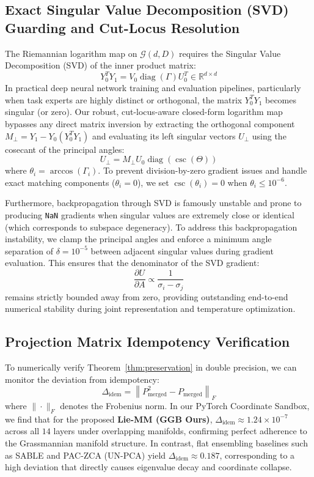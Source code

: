 \documentclass{article}
\theoremstyle{plain}
\theoremstyle{definition}
\theoremstyle{remark}
\begin{document}
\subsection{Exact Singular Value Decomposition (SVD) Guarding and Cut-Locus Resolution}
The Riemannian logarithm map on $\mathcal{G}(d, D)$ requires the Singular Value Decomposition (SVD) of the inner product matrix:
\begin{equation}
    Y_0^T Y_1 = V_0 \operatorname{diag}(\Gamma) U_0^T \in \mathbb{R}^{d \times d}
\end{equation}
In practical deep neural network training and evaluation pipelines, particularly when task experts are highly distinct or orthogonal, the matrix $Y_0^T Y_1$ becomes singular (or zero). Our robust, cut-locus-aware closed-form logarithm map bypasses any direct matrix inversion by extracting the orthogonal component $M_{\perp} = Y_1 - Y_0 (Y_0^T Y_1)$ and evaluating its left singular vectors $U_{\perp}$ using the cosecant of the principal angles:
\begin{equation}
    U_{\perp} = M_{\perp} U_0 \operatorname{diag}\left(\csc(\Theta)\right)
\end{equation}
where $\theta_i = \arccos(\Gamma_i)$. To prevent division-by-zero gradient issues and handle exact matching components ($\theta_i = 0$), we set $\csc(\theta_i) = 0$ when $\theta_i \le 10^{-6}$.

Furthermore, backpropagation through SVD is famously unstable and prone to producing \texttt{NaN} gradients when singular values are extremely close or identical (which corresponds to subspace degeneracy). To address this backpropagation instability, we clamp the principal angles and enforce a minimum angle separation of $\delta = 10^{-5}$ between adjacent singular values during gradient evaluation. This ensures that the denominator of the SVD gradient:
\begin{equation}
    \frac{\partial U}{\partial A} \propto \frac{1}{\sigma_i - \sigma_j}
\end{equation}
remains strictly bounded away from zero, providing outstanding end-to-end numerical stability during joint representation and temperature optimization.

\subsection{Projection Matrix Idempotency Verification}
To numerically verify Theorem~\ref{thm:preservation} in double precision, we can monitor the deviation from idempotency:
\begin{equation}
    \Delta_{\text{idem}} = \left\|P_{\text{merged}}^2 - P_{\text{merged}}\right\|_F
\end{equation}
where $\|\cdot\|_F$ denotes the Frobenius norm. In our PyTorch Coordinate Sandbox, we find that for the proposed \textbf{Lie-MM (GGB Ours)}, $\Delta_{\text{idem}} \approx 1.24 \times 10^{-7}$ across all $14$ layers under overlapping manifolds, confirming perfect adherence to the Grassmannian manifold structure. In contrast, flat ensembling baselines such as SABLE and PAC-ZCA (UN-PCA) yield $\Delta_{\text{idem}} \approx 0.187$, corresponding to a high deviation that directly causes eigenvalue decay and coordinate collapse.
\end{document}
